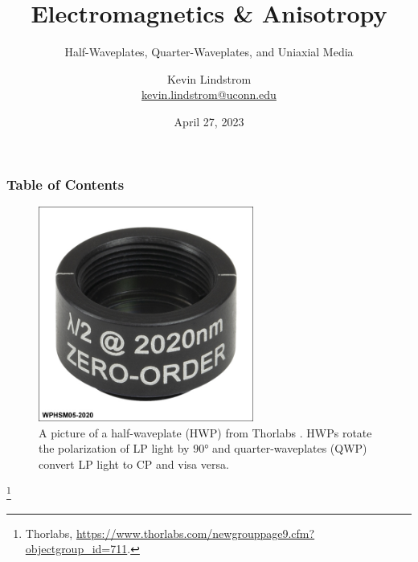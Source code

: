 \documentclass[aspectratio=169,t,xcolor=table]{beamer}
\newcommand\blfootnote[1]{%
  \begingroup
  \renewcommand\thefootnote{}\footnote[frame]{\tiny #1}%
  \addtocounter{footnote}{-1}%
  \endgroup
}
\begin{document}
\title{Electromagnetics \& Anisotropy}
\subtitle{Half-Waveplates, Quarter-Waveplates, and Uniaxial Media}

\author{Kevin Lindstrom\\
\textrm{\href{mailto:kevin.lindstrom@uconn.edu}{kevin.lindstrom@uconn.edu}}}
\date{April 27, 2023}


\frame[noframenumbering]{\titlepage}



\begin{frame}
    \frametitle{Table of Contents}\vspace{-1em}
    \begin{minipage}[t]{0.4\textwidth}
    \tableofcontents
    \end{minipage}
    \vline
    \hspace{1em}
    \begin{minipage}[t]{0.5\textwidth}
        \begin{figure}[H]
            \centering
            \includegraphics[width=0.63\textwidth]{figs/Waveplate.jpg}
            \caption{A picture of a half-waveplate (HWP) from Thorlabs \cite{WP}.
            HWPs rotate the polarization of LP light by $\ang{90}$ and 
            quarter-waveplates (QWP) convert LP light to CP and visa versa.}
        \end{figure}
    \end{minipage}
    \blfootnote{\tiny
        \cite{WP} Thorlabs, 
        \url{https://www.thorlabs.com/newgrouppage9.cfm?objectgroup_id=711}.
    }
\end{frame}
\end{document}
